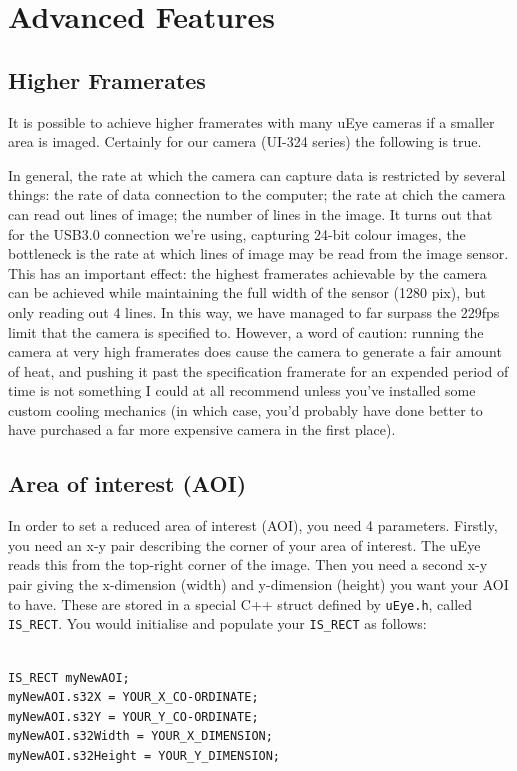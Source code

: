 \documentclass[12pt,a4paper]{article}
\begin{document}
\section{Advanced Features}


\subsection{Higher Framerates}

It is possible to achieve higher framerates with many uEye cameras if a smaller area is imaged. Certainly for our camera (UI-324 series) the following is true.

In general, the rate at which the camera can capture data is restricted by several things: the rate of data connection to the computer; the rate at chich the camera can read out lines of image; the number of lines in the image. It turns out that for the USB3.0 connection we're using, capturing 24-bit colour images, the bottleneck is the rate at which lines of image may be read from the image sensor. This has an important effect: the highest framerates achievable by the camera can be achieved while maintaining the full width of the sensor (1280 pix), but only reading out 4 lines. In this way, we have managed to far surpass the 229fps limit that the camera is specified to. However, a word of caution: running the camera at very high framerates does cause the camera to generate a fair amount of heat, and pushing it past the specification framerate for an expended period of time is not something I could at all recommend unless you've installed some custom cooling mechanics (in which case, you'd probably have done better to have purchased a far more expensive camera in the first place).

\subsection{Area of interest (AOI)}

In order to set a reduced area of interest (AOI), you need 4 parameters. Firstly, you need an x-y pair describing the corner of your area of interest. The uEye reads this from the top-right corner of the image. Then you need a second x-y pair giving the x-dimension (width) and y-dimension (height) you want your AOI to have. These are stored in a special C++ struct defined by \texttt{uEye.h}, called \texttt{IS\_RECT}. You would initialise and populate your \texttt{IS\_RECT} as follows:

\lstset{language=C++}
\begin{lstlisting}

IS_RECT myNewAOI;
myNewAOI.s32X = YOUR_X_CO-ORDINATE;
myNewAOI.s32Y = YOUR_Y_CO-ORDINATE;
myNewAOI.s32Width = YOUR_X_DIMENSION;
myNewAOI.s32Height = YOUR_Y_DIMENSION;

\end{lstlisting}
\end{document}
